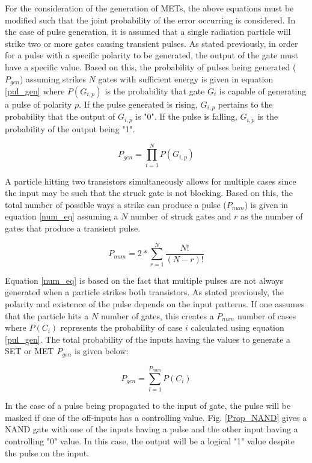 For the consideration of the generation of METs, the above equations must be modified such that the joint probability of the error occurring is considered. In the case of pulse generation, it is assumed that a single radiation particle will strike two or more gates causing transient pulses. As stated previously, in order for a pulse with a specific polarity to be generated, the output of the gate must have a specific value. Based on this, the probability of pulses being generated ($P_{gen}$) assuming strikes $N$ gates with sufficient energy is given in equation \ref{pul_gen} where $P(G_{i,p})$ is the probability that gate $G_i$ is capable of generating a pulse of polarity $p$. If the pulse generated is rising, $G_{i,p}$ pertains to the probability that the output of $G_{i,p}$ is "0". If the pulse is falling, $G_{i,p}$ is the probability of the output being "1".

\begin{equation} \label{pul_gen}
P_{gen} = \prod_{i=1}^{N} P(G_{i, p})
\end{equation}

A particle hitting two transistors simultaneously allows for multiple cases since the input may be such that the struck gate is not blocking. Based on this, the total number of possible ways a strike can produce a pulse ($P_{num}$) is given in equation \ref{num_eq} assuming a $N$ number of struck gates and $r$ as the number of gates that produce a transient pulse.

\begin{equation} \label{num_eq}
P_{num} = 2*\sum_{r=1}^{N} \frac{N!}{(N-r)!}
\end{equation}

Equation \ref{num_eq} is based on the fact that multiple pulses are not always generated when a particle strikes both transistors. As stated previously, the polarity and existence of the pulse depends on the input patterns. If one assumes that the particle hits a $N$ number of gates, this creates a $P_{num}$ number of cases where $P(C_i)$ represents the probability of case $i$ calculated using equation \ref{pul_gen}. The total probability of the inputs having the values to generate a SET or MET $P_{gen}$ is given below:

\begin{equation} \label{err_eq}
P_{gen} = \sum_{i=1}^{P_{num}} P(C_i)
\end{equation}

In the case of a pulse being propagated to the input of gate, the pulse will be masked if one of the off-inputs has a controlling value. Fig. \ref{Prop_NAND} gives a NAND gate with one of the inputs having a pulse and the other input having a controlling "0" value. In this case, the output will be a logical "1" value despite the pulse on the input.

